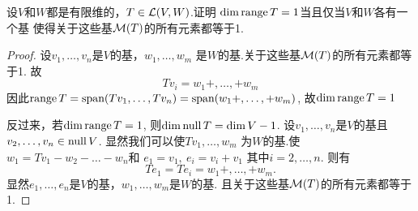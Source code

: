 \begin{problem}{6}
设$V$和$W$都是有限维的，$T\in\mathcal{L}(V,W)$.证明
$\dim \operatorname{range} T=1$当且仅当$V$和$W$各有一个基
使得关于这些基$\mathcal{M}(T)$的所有元素都等于1.
\end{problem}

\begin{proof}
	设$v_1,\dots,v_n$是$V$的基，$w_1,\dots,w_m$
	是$W$的基.关于这些基$\mathcal{M}(T)$的所有元素都等于1.
	故
	\begin{displaymath}
		Tv_i =w_1+,\dots,+w_m
	\end{displaymath}
	因此$\operatorname{range} T=\text{span}(Tv_1,\dots,Tv_n) = \text{span} (w_1+,\dots,+w_m)$,
	故$\dim \operatorname{range} T=1$

	反过来，若$\dim \operatorname{range} T=1$,
	则$\dim \operatorname{null} T = \dim V -1$.
	设$v_1,\dots,v_n$是$V$的基且$v_2,\dots,v_n\in \operatorname{null} V$.
	显然我们可以使$Tv_1,\dots,w_m$
	为$W$的基.使$w_1=Tv_1-w_2-\dots-w_n$和
	$e_1=v_1,\ e_i=v_i+v_1$ 其中$i=2,\dots,n$.
	则有
	\begin{displaymath}
		Te_1=Te_i=w_1+,\dots,+w_m.
	\end{displaymath}
	显然$e_1,\dots,e_n$是$V$的基，$w_1,\dots,w_m$是$W$的基.
	且关于这些基$\mathcal{M}(T)$的所有元素都等于1.

\end{proof}

